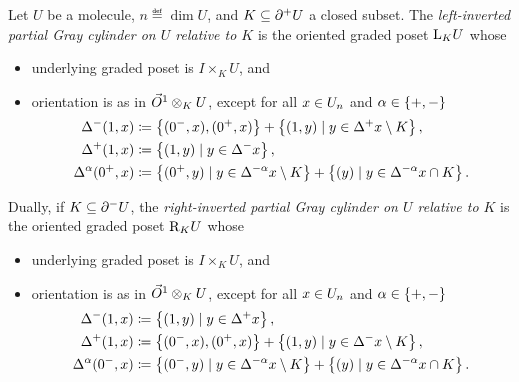 \begin{dfn} 
	Let \( U \) be a molecule, \( n \eqdef \dim U \), and \( K \subseteq \bd{}{+}U \) a closed subset.
	The \emph{left-inverted partial Gray cylinder on \( U \) relative to \( K \)} is the oriented graded poset \( \lcyl{K} U \) whose
    \begin{itemize}
        \item underlying graded poset is \( I \times_K U \), and
        \item orientation is as in \( \arr \gray_K U \), except for all \( x \in \gr{n}{U} \) and \( \a \in \set{+, -} \)
    \begin{align*}
        \faces{}{-}(1, x) &\eqdef \set{(0^-, x), (0^+, x)} + \set{(1, y) \mid y \in \faces{}{+}x \setminus K}, \\
        \faces{}{+}(1, x) &\eqdef \set{(1, y) \mid y \in \faces{}{-}x}, \\
        \faces{}{\a}(0^+, x) &\eqdef \set{(0^+, y) \mid y \in \faces{}{-\a}x \setminus K} + 
            \set{(y) \mid y \in \faces{}{-\a}x \cap K}.
    \end{align*}
\end{itemize}
	Dually, if \( K \subseteq \bd{}{-}U \), the \emph{right-inverted partial Gray cylinder on \( U \) relative to \( K \)} is the oriented graded poset \( \rcyl{K}{U} \) whose
    \begin{itemize}
        \item underlying graded poset is \( I \times_K U \), and
        \item orientation is as in \( \arr \gray_K U \), except for all \( x \in \gr{n}{U} \) and \( \a \in \set{+, -} \)
        \begin{align*}
            \faces{}{-}(1, x) &\eqdef \set{(1, y) \mid y \in \faces{}{+}x}, \\
            \faces{}{+}(1, x) &\eqdef \set{(0^-, x), (0^+, x)} + \set{(1, y) \mid y \in \faces{}{-}x \setminus K}, \\
            \faces{}{\a}(0^-, x) &\eqdef \set{(0^-, y) \mid y \in \faces{}{-\a}x \setminus K} + 
                \set{(y) \mid y \in \faces{}{-\a}x \cap K}.
        \end{align*}
    \end{itemize}
\end{dfn}

